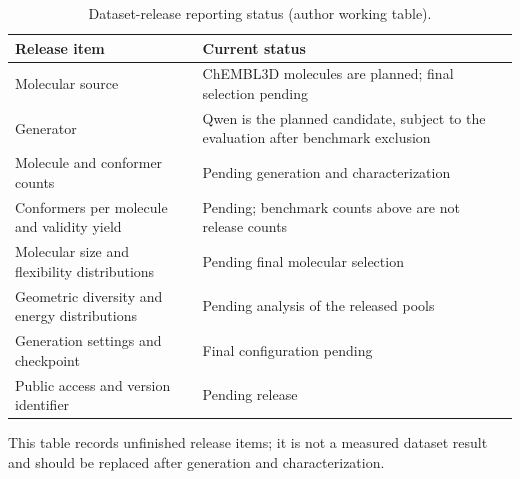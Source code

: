 \begin{table}[htbp]
\centering
\footnotesize
\setlength{\tabcolsep}{4pt}
\renewcommand{\arraystretch}{1.15}
\caption{Dataset-release reporting status (author working table).}
\label{tab:release-status}
\par\smallskip
\begin{tabular}{@{}>{\raggedright\arraybackslash}p{.31\linewidth}>{\raggedright\arraybackslash}p{.63\linewidth}@{}}
\toprule
Release item & Current status \\
\midrule
Molecular source & ChEMBL3D molecules are planned; final selection pending \\
Generator & Qwen is the planned candidate, subject to the evaluation after benchmark exclusion \\
Molecule and conformer counts & Pending generation and characterization \\
Conformers per molecule and validity yield & Pending; benchmark counts above are not release counts \\
Molecular size and flexibility distributions & Pending final molecular selection \\
Geometric diversity and energy distributions & Pending analysis of the released pools \\
Generation settings and checkpoint & Final configuration pending \\
Public access and version identifier & Pending release \\
\bottomrule
\end{tabular}
\par\smallskip
\begin{minipage}{\linewidth}
This table records unfinished release items; it is not a measured dataset result and should be replaced after generation and characterization.
\end{minipage}
\end{table}
